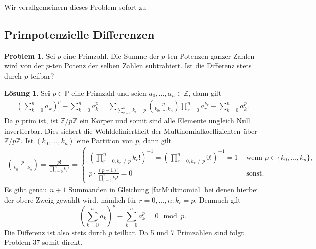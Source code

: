 \documentclass{article}
\theoremstyle{plain} %
\theoremstyle{definition} %
\newtheorem{problem}[theorem]{Problem}
\newtheorem{solution}[theorem]{Lösung}
\begin{document}
Wir verallgemeinern dieses Problem sofort zu

\subsection{Primpotenzielle Differenzen}

\begin{problem}
Sei $p$ eine Primzahl.
Die Summe der $p$-ten Potenzen ganzer Zahlen wird von der $p$-ten Potenz der selben Zahlen subtrahiert. Ist die Differenz stets durch $p$ teilbar?
\end{problem}

\begin{solution}

  Sei $p \in \mathbb{P}$ eine Primzahl und seien $a_0,...,a_n \in \mathbb{Z}$, dann gilt
  \begin{align}
    \left(\sum_{k=0}^n a_k\right)^p - \sum_{k=0}^n a_k^p = \sum_{\sum_{r=0}^n k_r = p} \binom{p}{k_0,\hdots,k_n} \prod_{r=0}^n a_r^{k_r} - \sum_{k=0}^n a_k^p. \label{fatMultinomial}
  \end{align}
  Da $p$ prim ist, ist $\mathbb{Z}/p\mathbb{Z}$ ein Körper und somit sind alle Elemente ungleich Null invertierbar. Dies sichert die Wohldefiniertheit der Multinomialkoeffizienten über $\mathbb{Z}/p\mathbb{Z}$.
  Ist $(k_0,...,k_n)$ eine Partition von $p$, dann gilt \begin{align}
    \binom{p}{k_0, \hdots, k_n} = \frac{p!}{\prod_{r=0}^n k_r!} = \begin{cases}
      (\prod_{r=0, k_r \neq p}^n k_r!)^{-1} = (\prod_{r=0, k_r \neq p}^n 0!)^{-1} = 1 & \text{ wenn } p \in \{k_0,...,k_n\}, \\
      p \cdot \frac{(p-1)!}{\prod_{r=0}^n k_r!} = 0                                   & \text{ sonst.}
    \end{cases}
  \end{align} Es gibt genau $n+1$ Summanden in Gleichung \ref{fatMultinomial} bei denen hierbei der obere Zweig gewählt wird, nämlich für $r=0,...,n : k_r = p$. Demnach gilt
  $$
    \left(\sum_{k=0}^n a_k\right)^p - \sum_{k=0}^n a_k^p = 0 \mod{p}.
  $$
  Die Differenz ist also stets durch $p$ teilbar.
  Da 5 und 7 Primzahlen sind folgt Problem 37 somit direkt.

\end{solution}

\printbibliography
\end{document}
